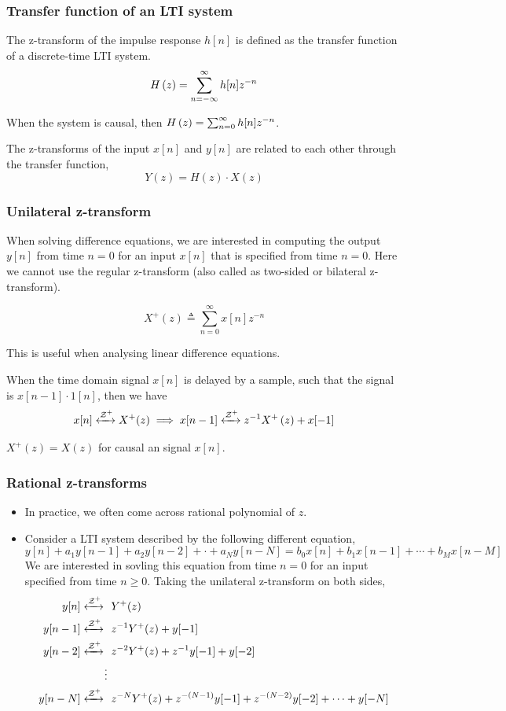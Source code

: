 \documentclass[aspectratio=169]{beamer}
\let\olditem\item
\renewcommand{\item}{\setlength{\itemsep}{\fill}\olditem}
\def\mc{\ensuremath\mathcal}
\def\lp{\ensuremath\left(}
\def\rp{\ensuremath\right)}
\begin{document}
\begin{frame}[t]
  \frametitle{Transfer function of an LTI system}

  The z-transform of the impulse response $h[n]$ is defined as the transfer function of a discrete-time LTI system.
  \[ H\lp z \rp = \sum_{n=-\infty}^{\infty} h[n] z^{-n} \]

  When the system is causal, then $H\lp z \rp = \sum_{n=0}^{\infty} h[n] z^{-n}$.

  The z-transforms of the input $x[n]$ and $y[n]$ are related to each other through the transfer function, 
  \[ Y(z) = H(z) \cdot X(z) \]
\end{frame}

\begin{frame}[t]
  \frametitle{Unilateral z-transform}

  When solving difference equations, we are interested in computing the output $y[n]$ from time $n=0$ for an input $x[n]$ that is specified from time $n=0$. Here we cannot use the regular z-transform (also called as two-sided or bilateral z-transform). 

  \[ X^+(z) \triangleq \sum_{n=0}^{\infty} x[n] z^{-n} \]
  
  This is useful when analysing linear difference equations.

  When the time domain signal $x[n]$ is delayed by a sample, such that the signal is $x[n-1] \cdot 1[n]$, then we have
  \[ x[n] \xleftrightarrow{\mc{Z}^+} X^+(z) \implies x[n-1] \xleftrightarrow{\mc{Z}^+} z^{-1} X^+\lp z \rp + x[-1] \]

  $X^+(z) = X(z)$ for causal an signal $x[n]$.
\end{frame}

\begin{frame}[t]
  \frametitle{Rational z-transforms}
  \begin{itemize}
    \item In practice, we often come across rational polynomial of $z$.
    \item Consider a LTI system described by the following different equation,
    \[ y[n] + a_1 y[n-1] + a_2 y[n-2] + \cdot + a_Ny[n - N] = b_0x[n] + b_1 x[n-1] + \cdots + b_M x[n - M] \] 
    We are interested in sovling this equation from time $n = 0$ for an input specified from time $n \geq 0$. Taking the unilateral z-transform on both sides,
    \[ \begin{split}
        y[n] \xleftrightarrow{\mc{Z}^+} \,\, & \,\, Y^+(z) \\
        y[n-1] \xleftrightarrow{\mc{Z}^+} \,\, & \,\, z^{-1}Y^+(z) + y[-1] \\
        y[n-2] \xleftrightarrow{\mc{Z}^+} \,\, & \,\, z^{-2}Y^+(z) + z^{-1}y[-1] + y[-2] \\
        \vdots & \\
        y[n-N] \xleftrightarrow{\mc{Z}^+} \,\, & \,\, z^{-N}Y^+(z) + z^{-(N-1)}y[-1] + z^{-(N-2)}y[-2] + \cdots + y[-N]
        \end{split} 
        \]
  \end{itemize}
\end{frame}
\end{document}
